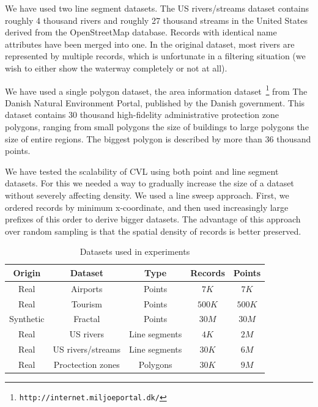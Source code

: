 We have used two line segment datasets. The US rivers/streams dataset contains roughly 4 thousand rivers and roughly 27 thousand streams in the United States derived from the OpenStreetMap database. Records with identical name attributes have been merged into one. In the original dataset, most rivers are represented by multiple records, which is unfortunate in a filtering situation (we wish to either show the waterway completely or not at all). 

We have used a single polygon dataset, the area information dataset~\footnote{\texttt{http://internet.miljoeportal.dk/}} from The Danish Natural Environment Portal, published by the Danish government. This dataset contains 30 thousand high-fidelity administrative protection zone polygons, ranging from small polygons the size of buildings to large polygons the size of entire regions. The biggest polygon is described by more than 36 thousand points.

We have tested the scalability of CVL using both point and line segment datasets. For this we needed a way to gradually increase the size of a dataset without severely affecting density.  We used a line sweep approach. First, we ordered records by minimum x-coordinate, and then used increasingly large prefixes of this order to derive bigger datasets. The advantage of this approach over random sampling is that the spatial density of records is better preserved.

\begin{table}[htdp]
\vspace{-2ex}
\caption{Datasets used in experiments}
\vspace{-2ex}
\label{tab:datasets}
\begin{center}
\begin{tabular}{|c|c|c|c|c|}
\hline
\textbf{Origin} & \textbf{Dataset} & \textbf{Type} & \textbf{Records} & \textbf{Points} \\
\hline
Real & Airports & Points & $7K$ & $7K$ \\
Real & Tourism & Points & $500K$ & $500K$ \\
Synthetic & Fractal & Points & $30M$ & $30M$ \\
Real & US rivers & Line segments & $4K$ & $2M$ \\
Real & US rivers/streams & Line segments & $30K$ & $6M$ \\
Real & Proctection zones & Polygons & $30K$ & $9M$ \\
\hline
\end{tabular}
\end{center}
\label{default}
\vspace{-2ex}
\end{table}%


